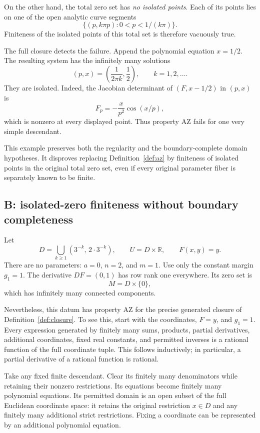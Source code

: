 \documentclass[11pt]{article}
\theoremstyle{definition}
\theoremstyle{remark}
\newcommand{\R}{\mathbb R}
\newcommand{\AZ}{\mathrm{AZ}}
\begin{document}
On the other hand, the total zero set has \emph{no isolated points}.
Each of its points lies on one of the open analytic curve segments
\[
 \{(p,k\pi p):0<p<1/(k\pi)\}.
\]
Finiteness of the isolated points of this total set is therefore
vacuously true.

The full closure detects the failure. Append the polynomial equation
\(x=1/2\). The resulting system has the infinitely many solutions
\[
 (p,x)=\left(\frac1{2\pi k},\frac12\right),
 \qquad k=1,2,\ldots.
\]
They are isolated. Indeed, the Jacobian determinant of
\((F,x-1/2)\) in \((p,x)\) is
\[
 F_p=-\frac{x}{p^2}\cos(x/p),
\]
which is nonzero at every displayed point. Thus property \(\AZ\)
fails for one very simple descendant.

This example preserves both the regularity and the boundary-complete
domain hypotheses. It disproves replacing Definition~\ref{def:az}
by finiteness of isolated points in the original total zero set,
even if every original parameter fiber is separately known to be
finite.

\subsection{B: isolated-zero finiteness without boundary completeness}
\label{subsec:example-b}

Let
\[
 D=\bigcup_{k\ge1}(3^{-k},\,2\cdot3^{-k}),\qquad
 U=D\times\R,\qquad F(x,y)=y.
\]
There are no parameters: \(a=0\), \(n=2\), and \(m=1\).
Use only the constant margin \(g_1=1\).
The derivative \(DF=(0,1)\) has row rank one everywhere. Its zero
set is
\[
 M=D\times\{0\},
\]
which has infinitely many connected components.

Nevertheless, this datum has property \(\AZ\) for the precise
generated closure of Definition~\ref{def:closure}. To see this,
start with the coordinates, \(F=y\), and \(g_1=1\). Every expression
generated by finitely many sums, products, partial derivatives,
additional coordinates, fixed real constants, and permitted
inverses is a rational function of the full coordinate tuple.
This follows inductively; in particular, a partial derivative of
a rational function is rational.

Take any fixed finite descendant. Clear its finitely many
denominators while retaining their nonzero restrictions. Its
equations become finitely many polynomial equations. Its permitted
domain is an open subset of the full Euclidean coordinate space:
it retains the original restriction \(x\in D\) and any finitely
many additional strict restrictions. Fixing a coordinate can be
represented by an additional polynomial equation.
\end{document}

